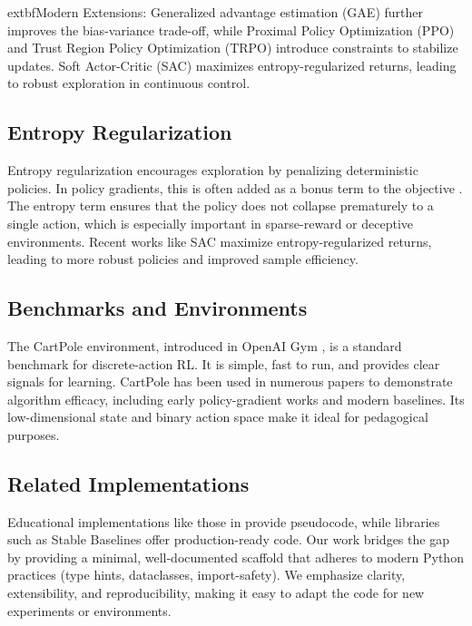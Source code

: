 \documentclass[conference]{IEEEtran}
\begin{document}
	extbf{Modern Extensions:} Generalized advantage estimation (GAE) \cite{schulman2015high} further improves the bias-variance trade-off, while Proximal Policy Optimization (PPO) \cite{schulman2017ppo} and Trust Region Policy Optimization (TRPO) introduce constraints to stabilize updates. Soft Actor-Critic (SAC) \cite{haarnoja2018soft} maximizes entropy-regularized returns, leading to robust exploration in continuous control.

\subsection{Entropy Regularization}

Entropy regularization encourages exploration by penalizing deterministic policies. In policy gradients, this is often added as a bonus term to the objective \cite{williams1991function}. The entropy term ensures that the policy does not collapse prematurely to a single action, which is especially important in sparse-reward or deceptive environments. Recent works like SAC maximize entropy-regularized returns, leading to more robust policies and improved sample efficiency.

\subsection{Benchmarks and Environments}

The CartPole environment, introduced in OpenAI Gym \cite{brockman2016openai}, is a standard benchmark for discrete-action RL. It is simple, fast to run, and provides clear signals for learning. CartPole has been used in numerous papers to demonstrate algorithm efficacy, including early policy-gradient works and modern baselines. Its low-dimensional state and binary action space make it ideal for pedagogical purposes.

\subsection{Related Implementations}

Educational implementations like those in \cite{sutton2018reinforcement} provide pseudocode, while libraries such as Stable Baselines \cite{stable-baselines} offer production-ready code. Our work bridges the gap by providing a minimal, well-documented scaffold that adheres to modern Python practices (type hints, dataclasses, import-safety). We emphasize clarity, extensibility, and reproducibility, making it easy to adapt the code for new experiments or environments.
\end{document}
